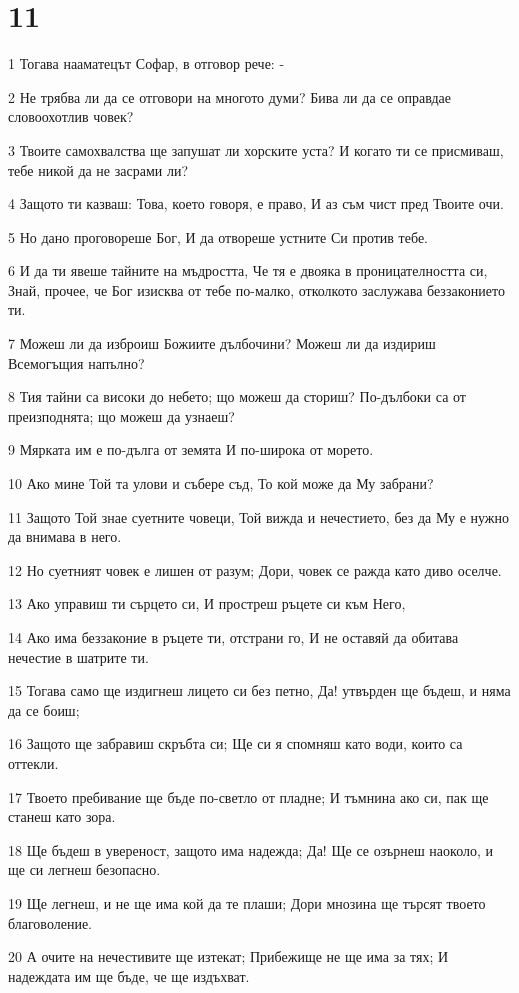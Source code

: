 \chapter{11}

\par 1 Тогава нааматецът Софар, в отговор рече: -
\par 2 Не трябва ли да се отговори на многото думи? Бива ли да се оправдае словоохотлив човек?
\par 3 Твоите самохвалства ще запушат ли хорските уста? И когато ти се присмиваш, тебе никой да не засрами ли?
\par 4 Защото ти казваш: Това, което говоря, е право, И аз съм чист пред Твоите очи.
\par 5 Но дано проговореше Бог, И да отвореше устните Си против тебе.
\par 6 И да ти явеше тайните на мъдростта, Че тя е двояка в проницателността си, Знай, прочее, че Бог изисква от тебе по-малко, отколкото заслужава беззаконието ти.
\par 7 Можеш ли да изброиш Божиите дълбочини? Можеш ли да издириш Всемогъщия напълно?
\par 8 Тия тайни са високи до небето; що можеш да сториш? По-дълбоки са от преизподнята; що можеш да узнаеш?
\par 9 Мярката им е по-дълга от земята И по-широка от морето.
\par 10 Ако мине Той та улови и събере съд, То кой може да Му забрани?
\par 11 Защото Той знае суетните човеци, Той вижда и нечестието, без да Му е нужно да внимава в него.
\par 12 Но суетният човек е лишен от разум; Дори, човек се ражда като диво оселче.
\par 13 Ако управиш ти сърцето си, И простреш ръцете си към Него,
\par 14 Ако има беззаконие в ръцете ти, отстрани го, И не оставяй да обитава нечестие в шатрите ти.
\par 15 Тогава само ще издигнеш лицето си без петно, Да! утвърден ще бъдеш, и няма да се боиш;
\par 16 Защото ще забравиш скръбта си; Ще си я спомняш като води, които са оттекли.
\par 17 Твоето пребивание ще бъде по-светло от пладне; И тъмнина ако си, пак ще станеш като зора.
\par 18 Ще бъдеш в увереност, защото има надежда; Да! Ще се озърнеш наоколо, и ще си легнеш безопасно.
\par 19 Ще легнеш, и не ще има кой да те плаши; Дори мнозина ще търсят твоето благоволение.
\par 20 А очите на нечестивите ще изтекат; Прибежище не ще има за тях; И надеждата им ще бъде, че ще издъхват.


